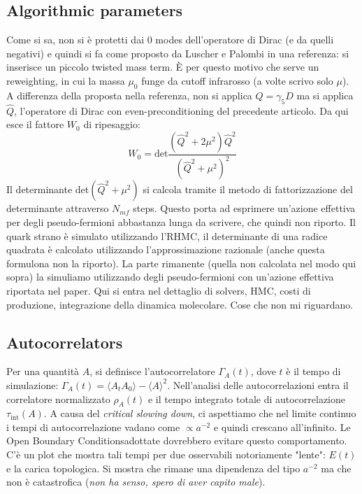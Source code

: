 \documentclass[12pt,a4paper,openright]{article}
\newcommand{\la}{\langle}
\newcommand{\ra}{\rangle}
\newcommand{\colg}{\textcolor{PineGreen}}
\newcommand{\colr}{\textcolor{BrickRed}}
\newcommand{\obc}{Open Boundary Conditions}
\begin{document}
\subsection{Algorithmic parameters}
Come si sa, non si è protetti dai 0 modes dell'operatore di Dirac (e da quelli negativi) e quindi si fa come proposto da Luscher e Palombi in una referenza: si inserisce un piccolo twisted mass term.
\colg{È per questo motivo che serve un reweighting}, in cui la massa $\mu_0$ funge da cutoff infrarosso (a volte scrivo solo $\mu$). A differenza della proposta nella referenza, non si applica $Q = \gamma_5 D$ ma si applica $\hat Q$, l'operatore di Dirac con even-preconditioning del precedente articolo.
Da qui esce il fattore $W_0$ di ripesaggio:
\begin{equation*}
  W_0 = \text{det}\frac{ \left(\hat Q^2 + 2\mu^2\right) \hat Q^2} {\left(\hat Q^2 + \mu^2\right)^2}
\end{equation*}
Il determinante det$\left(\hat Q^2 + \mu^2\right)$ si calcola tramite il metodo di \colg{fattorizzazione del determinante} attraverso $N_{mf}$ steps.
Questo porta ad esprimere un'azione effettiva per degli \colg{pseudo-fermioni} abbastanza lunga da scrivere, che quindi non riporto.
\newline
Il quark strano è simulato utilizzando l'RHMC, il determinante di una radice quadrata è calcolato utilizzando l'approssimazione razionale (anche questa formulona non la riporto).
La parte rimanente (quella non calcolata nel modo qui sopra) \colg{la simuliamo utilizzando degli pseudo-fermioni} con un'azione effettiva riportata nel paper.
\newline
\colr{Qui si entra nel dettaglio di solvers, HMC, costi di produzione, integrazione della dinamica molecolare. Cose che non mi riguardano.}
\subsection{Autocorrelators}
Per una quantità $A$, si definisce l'autocorrelatore $\Gamma_A (t)$, dove $t$ è il tempo di simulazione: $\Gamma_A (t) = \la A_t A_0 \ra - \la A \ra^2$.
Nell'analisi delle autocorrelazioni entra il correlatore normalizzato $\rho_A (t)$ e il tempo integrato totale di autocorrelazione $\tau_\text{int}(A)$.
\newline
A causa del {\it critical slowing down}, ci aspettiamo che nel limite continuo i tempi di autocorrelazione vadano come $\propto a^{-2}$ e quindi crescano all'infinito.
\colg{Le \obc adottate dovrebbero evitare questo comportamento}.
C'è un plot che mostra tali tempi per due osservabili notoriamente "lente": $E(t)$ e la carica topologica.
Si mostra che rimane una dipendenza del tipo $a^{-2}$ ma che non è catastrofica (\colr{\it non ha senso, spero di aver capito male}).
\end{document}
